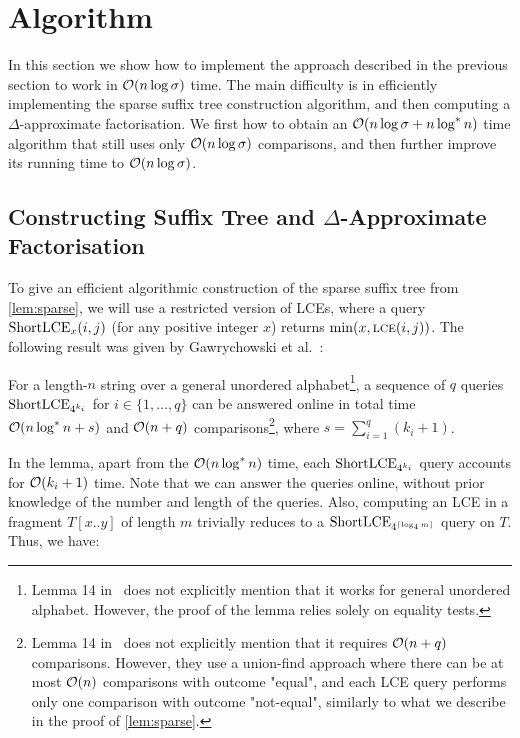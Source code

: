 \section{Algorithm}
\label{sec:alg}

In this section we show how to implement the approach described in the previous section
to work in $\mathcal{O}(n\log \sigma)$ time. The main
difficulty is in efficiently implementing the sparse suffix tree construction algorithm, and
then computing a $\Delta$-approximate factorisation. We first how to obtain an $\mathcal{O}(n\log \sigma+n\log^{*}n)$ time
algorithm that still uses only $\mathcal{O}(n\log \sigma)$ comparisons, and then further improve its running time to $\mathcal{O}(n\log \sigma)$.

\subsection[Constructing Suffix Tree and Delta-Approximate Factorisation]{Constructing Suffix Tree and \boldmath$\Delta$\unboldmath-Approximate Factorisation}
\label{sec:suffixtree}

To give an efficient algorithmic construction of the sparse suffix tree from \cref{lem:sparse}, we will use a restricted version of LCEs, where a query $\textnormal{ShortLCE}_x(i, j)$ (for any positive integer $x$) returns $\min(x, \textnormal{\textsc{lce}}(i, j))$. The following result was given by Gawrychowski et al.~\cite{Gawrychowski2016}:

\begin{lemma}
\label{lem:LCE_undordered_original}
For a length-$n$ string over a general unordered alphabet\footnote{Lemma 14 in~\cite{Gawrychowski2016} does not explicitly mention that it works for general unordered alphabet. However, the proof of the lemma relies solely on equality tests.}, a sequence of $q$ queries $\textnormal{ShortLCE}_{4^{k_i}}$ for $i \in \{1, \dots, q\}$ can be answered online in total time $\mathcal{O}(n \log^* n + s)$ and $\mathcal{O}(n + q)$ comparisons\footnote{Lemma 14 in~\cite{Gawrychowski2016} does not explicitly mention that it requires $\mathcal{O}(n + q)$ comparisons. However, they use a union-find approach where there can be at most $\mathcal{O}(n)$ comparisons with outcome "equal", and each LCE query performs only one comparison with outcome "not-equal", similarly to what we describe in the proof of \cref{lem:sparse}.}, where $s = \sum_{i = 1}^q(k_i + 1)$.
\end{lemma}

In the lemma, apart from the $\mathcal{O}(n \log^* n)$ time, each $\textnormal{ShortLCE}_{4^{k_i}}$ query accounts for $\mathcal{O}(k_i + 1)$ time. Note that we can answer the queries online, without prior knowledge of the number and length of the queries. Also, computing an LCE in a fragment $T[x..y]$ of length $m$ trivially reduces to a $\textnormal{ShortLCE}_{4^{\left\lceil\log_4 m\right\rceil}}$ query on $T$. Thus, we have:

